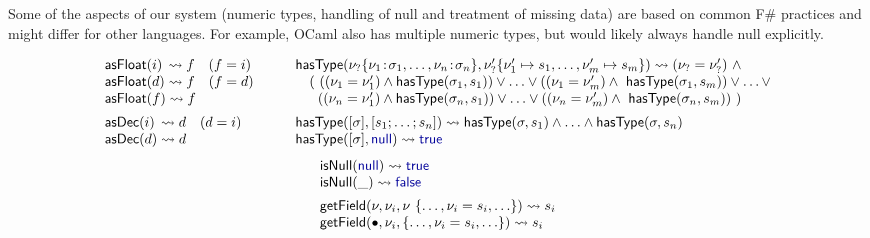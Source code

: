 \documentclass[10pt,preprint,blind,clearpagebib]{sigplanconf}
\newcommand{\kvd}[1]{\textnormal{\textcolor{kvdclr}{\sffamily #1}}}
\newcommand{\ident}[1]{\textnormal{\sffamily #1}}
\newcommand{\reduce}{\rightsquigarrow}
\begin{document}
Some of the aspects of our system (numeric types, handling of \kvd{null} and treatment of
missing data) are based on common F\# practices and might differ for other languages. For example, 
OCaml also has multiple numeric types, but would likely always handle \kvd{null} explicitly.


\begin{figure}
\noindent
\begin{equation*}
\begin{array}{l}
\ident{asFloat}(i) \,\reduce f\quad(f = i)\\
\ident{asFloat}(d) \reduce f\quad(f = d)\\
\ident{asFloat}(f) \reduce f
\\[0.5em]
\ident{asDec}(i) \,\reduce d\quad(d = i)\\
\ident{asDec}(d) \reduce d
\end{array}
\qquad
\begin{array}{l}
\ident{hasType}(\nu_? \{ \nu_1 \!:\! \sigma_1, \ldots, \nu_n \!:\! \sigma_n \}, \nu'_? \{ \nu'_1\mapsto s_1, \ldots, \nu'_m\mapsto s_m \}) \reduce (\nu_? = \nu'_?) ~\wedge \\
  \quad (~ ((\nu_1 = \nu'_1) \wedge \ident{hasType}(\sigma_1, s_1)) \vee\ldots\vee ((\nu_1 = \nu'_m) \wedge \ident{hasType}(\sigma_1, s_m)) \vee \ldots \vee\\
  \quad ~\; ((\nu_n = \nu'_1) \wedge \ident{hasType}(\sigma_n, s_1)) \vee\ldots\vee ((\nu_n = \nu'_m) \wedge \ident{hasType}(\sigma_n, s_m))~)
\\[0.5em]
\ident{hasType}([\sigma], [s_1; \ldots; s_n]) \reduce \ident{hasType}(\sigma, s_1)\wedge\ldots\wedge\ident{hasType}(\sigma, s_n) \\
\ident{hasType}([\sigma], \kvd{null}) \reduce \kvd{true} \\  
\end{array}  
\end{equation*}
%
\vspace{-0.5em}
%
\begin{equation*}
\begin{array}{l}
\ident{isNull}(\kvd{null}) \reduce \kvd{true} \\
\ident{isNull}(\_) \reduce \kvd{false} 
\\[0.5em]
\ident{getField}(\nu,\nu_i, \nu~\{\ldots, \nu_i=s_i, \ldots\}) \reduce s_i\\
\ident{getField}(\bullet, \nu_i, \{\ldots, \nu_i=s_i, \ldots\}) \reduce s_i\\

\end{array}
\end{equation*}
\end{figure}
\end{document}
